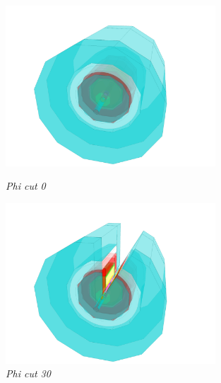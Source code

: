 \documentclass[a4paper,10pt]{article}
\begin{document}
\begin{figure}[h]
\begin{minipage}[t]{6cm}
\centerline{\includegraphics[height=6cm]{phi_cut_0.png}}
\caption{\label{CEDViewer} \textsl{Phi cut 0}}
\end{minipage}
\begin{minipage}[t]{6cm}
\setlength{\fboxsep}{0mm}
\centerline{\includegraphics[height=6cm]{phi_cut_30.png}}
\caption{\label{DSTViewer}\textsl{Phi cut 30}}
\end{minipage}

\end{figure}
\end{document}
